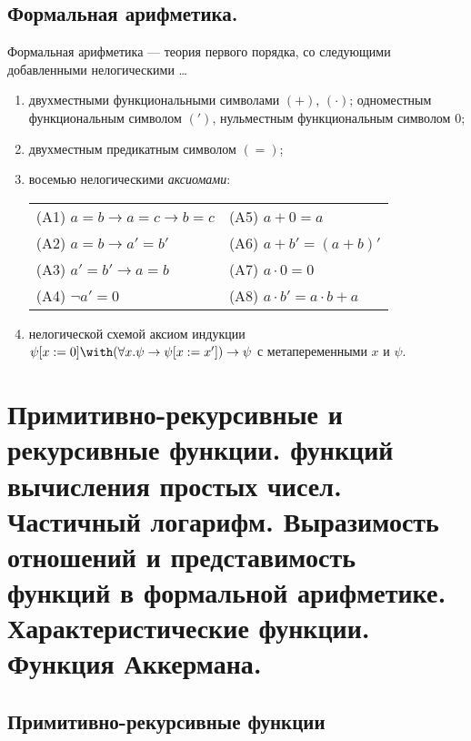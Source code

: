 \documentclass[10pt,a4paper,oneside]{article}
\begin{document}
\subsection{Формальная арифметика.}
Формальная арифметика --- теория первого порядка, со следующими добавленными нелогическими \dots
\begin{enumerate}
\item двухместными функциональными символами $(+)$, $(\cdot)$; одноместным функциональным символом $(')$, 
нульместным функциональным символом $0$;
\item двухместным предикатным символом $(=)$;
\item восемью нелогическими \emph{аксиомами}:\vspace{0.1cm}
\begin{tabular}{ll}
(A1) $a=b \to a=c \to b=c$             &(A5) $a+0 = a$                     \\
(A2) $a=b \to a'=b'$                   &(A6) $a+b' = (a+b)'$               \\
(A3) $a'=b' \to a=b$                   &(A7) $a\cdot 0 = 0$                \\
(A4) $\neg a' = 0$                     &(A8) $a\cdot b' = a \cdot b + a$
\end{tabular}
\item нелогической схемой аксиом индукции $\psi[x:=0]\with(\forall x.\psi\to \psi[x:=x'])\to \psi$ с метапеременными $x$ и $\psi$.
\end{enumerate}

\section{Примитивно-рекурсивные и рекурсивные функции. 
функций вычисления простых чисел. Частичный логарифм.
Выразимость отношений и представимость функций в формальной арифметике. Характеристические функции.
Функция Аккермана.}

\subsection{Примитивно-рекурсивные функции}
\end{document}
